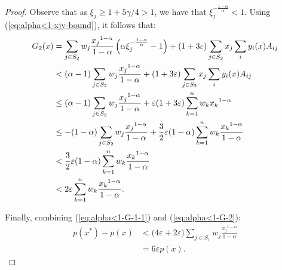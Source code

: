 \documentclass[11pt]{article}
\begin{document}
\begin{proof}
Observe that as $\xi_j \geq 1+5\gamma/4>1$, we have that $\xi_j^{-\frac{1-\alpha}{\alpha}}<1$. Using (\ref{eq:alpha<1-xjy-bound}), it follows that:
\begin{align}
G_2(x) & = \sum_{j\in S_2} w_j \frac{{x_j}^{1-\alpha}}{1-\alpha}\left(\alpha \xi_j^{-\frac{1-\alpha}{\alpha}}-1\right) + (1+3\varepsilon)\sum_{j\in S_2}  x_j \sum_i y_i(x)A_{ij}\notag\\
&< (\alpha-1) \sum_{j\in S_2} w_j \frac{{x_j}^{1-\alpha}}{1-\alpha} + (1+3\varepsilon)\sum_{j\in S_2}x_j\sum_i y_i(x)A_{ij}\notag\\
&\leq (\alpha-1) \sum_{j\in S_2} w_j \frac{{x_j}^{1-\alpha}}{1-\alpha} + \varepsilon (1+3\varepsilon)\sum_{k=1}^n w_k {x_k}^{1-\alpha}\notag\\
&\leq -(1-\alpha)\sum_{j\in S_2} w_j \frac{{x_j}^{1-\alpha}}{1-\alpha} + \frac{3}{2}\varepsilon (1-\alpha) \sum_{k=1}^n w_k \frac{{x_k}^{1-\alpha}}{1-\alpha}\notag\\
&< \frac{3}{2}\varepsilon (1-\alpha) \sum_{k=1}^n w_k \frac{{x_k}^{1-\alpha}}{1-\alpha}\notag\\
&< 2{\varepsilon}\sum_{k=1}^n w_k \frac{{x_k}^{1-\alpha}}{1-\alpha}. \label{eq:alpha<1-G-2}
\end{align}

Finally, combining (\ref{eq:alpha<1-G-1-1}) and (\ref{eq:alpha<1-G-2}):
\begin{align*}
p(x^*) - p(x) &< \Big(4\varepsilon + 2\varepsilon\Big) \sum_{j\in S_1} w_j \frac{{x_j}^{1-\alpha}}{1-\alpha}\\
&= 6\varepsilon p(x).
\end{align*}
\end{proof}
\end{document}
